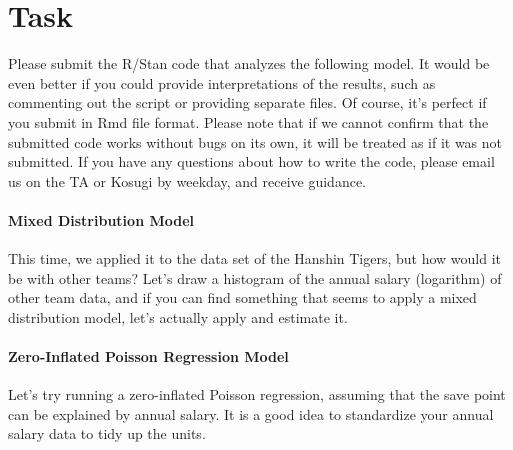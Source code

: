 \documentclass{ltjsbook}
\begin{document}
\section{Task} Please submit the R/Stan code that analyzes the following model. It would be even better if you could provide interpretations of the results, such as commenting out the script or providing separate files. Of course, it’s perfect if you submit in Rmd file format. Please note that if we cannot confirm that the submitted code works without bugs on its own, it will be treated as if it was not submitted. If you have any questions about how to write the code, please email us on the TA or Kosugi by weekday, and receive guidance.

\paragraph{Mixed Distribution Model} This time, we applied it to the data set of the Hanshin Tigers, but how would it be with other teams? Let's draw a histogram of the annual salary (logarithm) of other team data, and if you can find something that seems to apply a mixed distribution model, let's actually apply and estimate it.
\paragraph{Zero-Inflated Poisson Regression Model} Let's try running a zero-inflated Poisson regression, assuming that the save point can be explained by annual salary. It is a good idea to standardize your annual salary data to tidy up the units.
\end{document}

